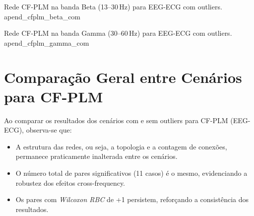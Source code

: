 \begin{apendicesenv}
{Rede CF-PLM na banda Beta (13--30\,Hz) para EEG-ECG com outliers.}
{apend_cfplm_beta_com}

{Rede CF-PLM na banda Gamma (30--60\,Hz) para EEG-ECG com outliers.}
{apend_cfplm_gamma_com}

\section{Comparação Geral entre Cenários para CF-PLM}
Ao comparar os resultados dos cenários com e sem outliers para CF-PLM (EEG-ECG), observa-se que:
\begin{itemize}
    \item A estrutura das redes, ou seja, a topologia e a contagem de conexões, permanece praticamente inalterada entre os cenários.
    \item O número total de pares significativos (11 casos) é o mesmo, evidenciando a robustez dos efeitos cross-frequency.
    \item Os pares com \emph{Wilcoxon RBC} de +1 persistem, reforçando a consistência dos resultados.
\end{itemize}
  
\end{apendicesenv}
